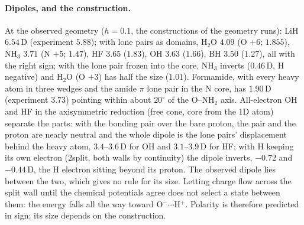 \documentclass[11pt]{article}
\begin{document}
\paragraph{Dipoles, and the construction.} At the observed geometry ($h = 0.1$, the constructions of the
geometry runs): LiH $6.54$\,D (experiment $5.88$); with lone pairs as domains, H$_2$O $4.09$ (O $+6$; $1.855$),
NH$_3$ $3.71$ (N $+5$; $1.47$), HF $3.65$ ($1.83$), OH $3.63$ ($1.66$), BH $3.50$ ($1.27$), all with the right sign;
with the lone pair frozen into the core, NH$_3$ inverts ($0.46$\,D, H negative) and H$_2$O (O $+3$) has half the
size ($1.01$). Formamide, with every heavy atom in three wedges and the amide $\pi$ lone pair in the N core, has
$1.90$\,D (experiment $3.73$) pointing within about $20^\circ$ of the O--NH$_2$ axis. All-electron OH and HF in the
axisymmetric reduction (free cone, core from the 1D atom) separate the parts: with the bonding pair over the bare
proton, the pair and the proton are nearly neutral and the whole dipole is the lone pairs' displacement behind
the heavy atom, $3.4$--$3.6$\,D for OH and $3.1$--$3.9$\,D for HF; with H keeping its own electron (2split, both
walls by continuity) the dipole inverts, $-0.72$ and $-0.44$\,D, the H electron sitting beyond its proton. The
observed dipole lies between the two, which gives no rule for its size. Letting charge flow across the
split wall until the chemical potentials agree does not select a state between them: the energy falls all the
way toward O$^-\cdots$H$^+$. Polarity is therefore predicted in sign; its size depends on the construction.

\end{document}

